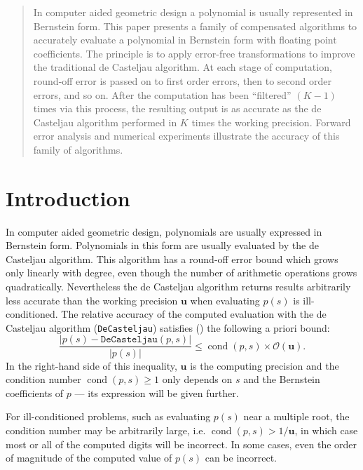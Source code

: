 \documentclass[letterpaper,10pt]{article}
\theoremstyle{definition}
\newcommand{\cond}[1]{\operatorname{cond}\left(#1\right)}
\newcommand{\mach}{\mathbf{u}}
\begin{document}
\begin{abstract}
In computer aided geometric design a polynomial is usually represented in
Bernstein form. This paper presents a family of compensated algorithms to
accurately evaluate a polynomial in Bernstein form with floating point
coefficients. The principle is to apply error-free transformations to
improve the traditional de Casteljau algorithm. At each stage of computation,
round-off error is passed on to first order errors, then to second order
errors, and so on. After the computation has been ``filtered'' \((K - 1)\)
times via this process, the resulting output is as accurate as the de Casteljau
algorithm performed in \(K\) times the working precision. Forward error
analysis and numerical experiments illustrate the accuracy of this family
of algorithms.
\end{abstract}

\tableofcontents

\section{Introduction}

In computer aided geometric design, polynomials are usually expressed in
Bernstein form. Polynomials in this form are usually evaluated by the
de Casteljau algorithm. This algorithm has a round-off error bound
which grows only linearly with degree, even though the number of
arithmetic operations grows quadratically. Nevertheless the de Casteljau
algorithm returns results arbitrarily less accurate than the working
precision \(\mach\) when evaluating \(p(s)\) is ill-conditioned.
The relative accuracy of the computed
evaluation with the de Casteljau algorithm (\texttt{DeCasteljau}) satisfies
(\cite{Mainar1999}) the following a priori bound:
\begin{equation}\label{de-casteljau-error}
  \frac{\left|p(s) - \mathtt{DeCasteljau}(p, s)\right|}{\left|p(s)\right|} \leq
  \cond{p, s} \times \mathcal{O}(\mach).
\end{equation}
In the right-hand side of this inequality, \(\mach\) is the computing
precision and the condition number \(\cond{p, s} \geq 1\) only depends
on \(s\) and the Bernstein coefficients of \(p\) --- its expression will
be given further.

For ill-conditioned problems, such as evaluating \(p(s)\) near a
multiple root, the condition number may be arbitrarily large, i.e.
\(\cond{p, s} > 1 / \mach\), in
which case most or all of the computed digits will be incorrect.
In some cases, even the order of magnitude of the computed value
of \(p(s)\) can be incorrect.
\end{document}
